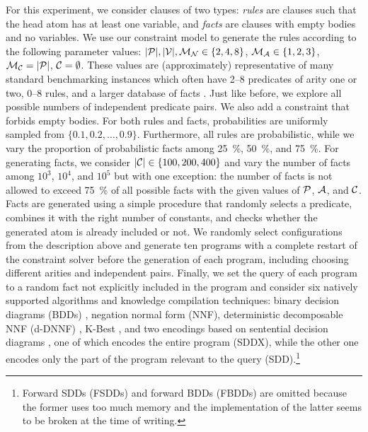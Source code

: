 For this experiment, we consider clauses of two types: \emph{rules} are clauses
such that the head atom has at least one variable, and \emph{facts} are clauses
with empty bodies and no variables. We use our constraint model to generate the
rules according to the following parameter values: $|\mathcal{P}{}|,
|\mathcal{V}{}|, \mathcal{M}_{\mathcal{N}}{} \in \{ 2, 4, 8 \}$, $\mathcal{M}_{\mathcal{A}}{} \in \{ 1, 2, 3
\}$, $\mathcal{M}_{\mathcal{C}}{} = |\mathcal{P}{}|$, $\mathcal{C}{} = \emptyset$. These
values are (approximately) representative of many standard benchmarking
instances which often have 2--8 predicates of arity one or two, 0--8 rules, and
a larger database of facts \citep{DBLP:journals/tplp/FierensBRSGTJR15}. Just like
before, we explore all possible numbers of independent predicate pairs. We also
add a constraint that forbids empty bodies. For both rules and facts,
probabilities are uniformly sampled from $\{ 0.1, 0.2, \dots, 0.9 \}$.
Furthermore, all rules are probabilistic, while we vary the proportion of
probabilistic facts among \SI{25}{\percent}, \SI{50}{\percent}, and
\SI{75}{\percent}. For generating facts, we consider $|\mathcal{C}{}| \in \{100,
200, 400 \}$ and vary the number of facts among $10^3$, $10^4$, and $10^5$ but
with one exception: the number of facts is not allowed to exceed
\SI{75}{\percent} of all possible facts with the given values of
$\mathcal{P}{}$, $\mathcal{A}{}$, and $\mathcal{C}{}$. Facts are generated using a
simple procedure that randomly selects a predicate, combines it with the right
number of constants, and checks whether the generated atom is already included
or not. We randomly select configurations from the description above and
generate ten programs with a complete restart of the constraint solver before
the generation of each program, including choosing different arities and
independent pairs. Finally, we set the query of each program to a random fact
not explicitly included in the program and consider six natively supported
algorithms and knowledge compilation techniques: binary decision diagrams (BDDs)
\citep{DBLP:journals/tc/Bryant86}, negation normal form (NNF), deterministic
decomposable NNF (d-DNNF) \citep{DBLP:journals/jair/DarwicheM02}, K-Best
\citep{DBLP:conf/ijcai/RaedtKT07}, and two encodings based on sentential decision
diagrams \citep{DBLP:conf/ijcai/Darwiche11}, one of which encodes the entire
program (SDDX), while the other one encodes only the part of the program
relevant to the query (SDD).\footnote{Forward SDDs (FSDDs) and forward BDDs
  (FBDDs) \citep{DBLP:conf/aaai/TsamouraGK20,DBLP:conf/ijcai/VlasselaerBKMR15}
  are omitted because the former uses too much memory and the implementation of
  the latter seems to be broken at the time of writing.}

